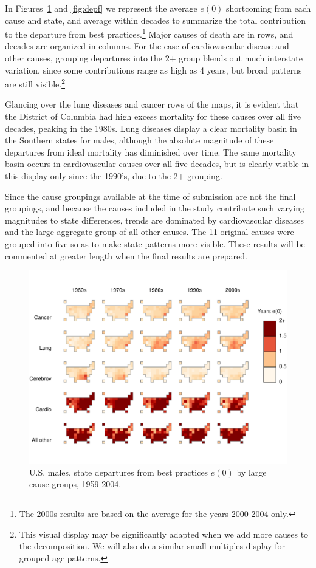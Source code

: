 \documentclass[11pt,oneside,a4paper]{article} %
\begin{document}
In Figures~\ref{fig:depm} and \ref{fig:depf} we represent the average $e(0)$
shortcoming from each cause and state, and average within decades to summarize the total contribution
to the departure from best practices.\footnote{The 2000s results are based on
the average for the years 2000-2004 only.} Major causes of death are in rows,
and decades are organized in columns. For the case of cardiovascular disease and other causes, grouping departures into the 2$+$ group blends out much
interstate variation, since some contributions range as high as 4
years, but broad patterns are still visible.\footnote{This visual display may be
significantly adapted when we add more causes to the decomposition. We will also do a similar small multiples
display for grouped age patterns.}

Glancing over the lung diseases and cancer rows of the maps, it is evident that
the District of Columbia had high excess mortality for these causes over all
five decades, peaking in the 1980s. Lung diseases display a clear mortality
basin in the Southern states for males, although the absolute magnitude of these departures from ideal mortality has diminished over time. The same mortality basin occurs in
cardiovascular causes over all five decades, but is clearly visible in this
display only since the 1990's, due to the 2$+$ grouping.

Since the cause groupings available at the time of submission are not the final groupings, and
because the causes included in the study contribute such varying magnitudes to
state differences, trends are dominated by cardiovascular diseases and the large
aggregate group of all other causes. The 11 original causes were grouped into
five so as to make state patterns more visible. These results will be commented
at greater length when the final results are prepared.

\begin{figure}
\centering
\caption{U.S. males, state departures from best practices $e(0)$ by large cause
groups, 1959-2004.}
\label{fig:depm}
\includegraphics[scale=0.7]{Figures/StatesDecadesM.pdf}
\end{figure}
\end{document}
